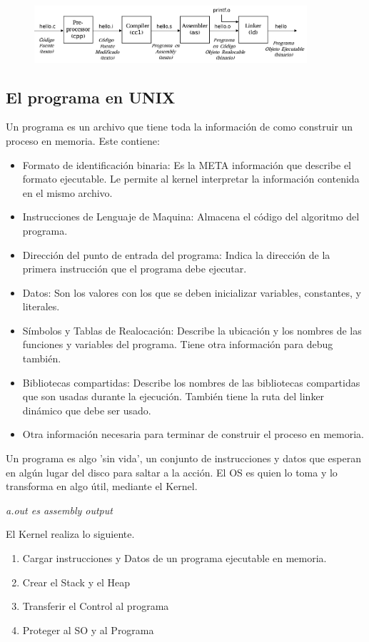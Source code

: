 \documentclass[titlepage,a4paper]{article}
\begin{document}
\begin{figure}[!htb]
    \centering
    \includegraphics[width=0.9\textwidth]{ImagenesApunte/compilation.jpg}
\end{figure}

\subsection*{El programa en UNIX}
Un programa es un archivo que tiene toda la información de como construir un proceso en memoria. Este contiene:
\begin{itemize}
    \item Formato de identificación binaria: Es la META información que describe el formato ejecutable. Le permite al kernel interpretar la información contenida en el mismo archivo.
    \item Instrucciones de Lenguaje de Maquina: Almacena el código del algoritmo del programa.
    \item Dirección del punto de entrada del programa: Indica la dirección de la primera instrucción que el programa debe ejecutar.
    \item Datos: Son los valores con los que se deben inicializar variables, constantes, y literales.
    \item Símbolos y Tablas de Realocación: Describe la ubicación y los nombres de las funciones y variables del programa. Tiene otra información para debug también.
    \item Bibliotecas compartidas: Describe los nombres de las bibliotecas compartidas que son usadas durante la ejecución. También tiene la ruta del linker dinámico que debe ser usado.
    \item Otra información necesaria para terminar de construir el proceso en memoria.
\end{itemize}

Un programa es algo 'sin vida', un conjunto de instrucciones y datos que esperan en algún lugar del disco para saltar a la acción. El OS es quien lo toma y lo transforma en algo útil, mediante el Kernel.

\textit{a.out es assembly output}

El Kernel realiza lo siguiente.
\begin{enumerate}
    \item Cargar instrucciones y Datos de un programa ejecutable en memoria.
    \item Crear el Stack y el Heap
    \item Transferir el Control al programa
    \item Proteger al SO y al Programa
\end{enumerate}
\end{document}
